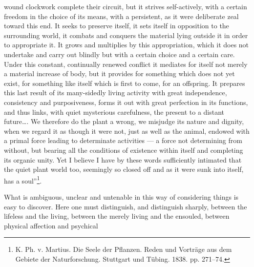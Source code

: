 \documentclass[12pt,a4paper]{book}
\begin{document}
\setcounter{footnote}{0}
wound clockwork complete their circuit, but it strives self-actively, with a certain
freedom in the choice of its means, with a persistent, as it were deliberate zeal
toward this end. It seeks to preserve itself, it sets itself in opposition to the
surrounding world, it combats and conquers the material lying outside it in order to
appropriate it. It grows and multiplies by this appropriation, which it does not
undertake and carry out blindly but with a certain choice and a certain care. Under
this constant, continually renewed conflict it mediates for itself not merely a
material increase of body, but it provides for something which does not yet exist,
for something like itself which is first to come, for an offspring. It prepares this
last result of its many-sidedly living activity with great independence, consistency
and purposiveness, forms it out with great perfection in its functions, and thus
links, with quiet mysterious carefulness, the present to a distant
future\ldots. We therefore do the plant a wrong, we misjudge its nature and dignity,
when we regard it as though it were not, just as well as the animal, endowed with a
primal force leading to determinate activities --- a force not determining from
without, but bearing all the conditions of existence within itself and completing
its organic unity. Yet I believe I have by these words sufficiently intimated that
the quiet plant world too, seemingly so closed off and as it were sunk into itself,
has a soul''\footnote{K. Ph. v. Martius. Die Seele der Pflanzen. Reden und Vorträge
aus dem Gebiete der Naturforschung. Stuttgart und Tübing. 1838. pp. 271--74.}.

What is ambiguous, unclear and untenable in this way of considering things is easy
to discover. Here one must distinguish, and distinguish sharply, between the
lifeless and the living, between the merely living and the ensouled, between
physical affection and psychical
\end{document}
